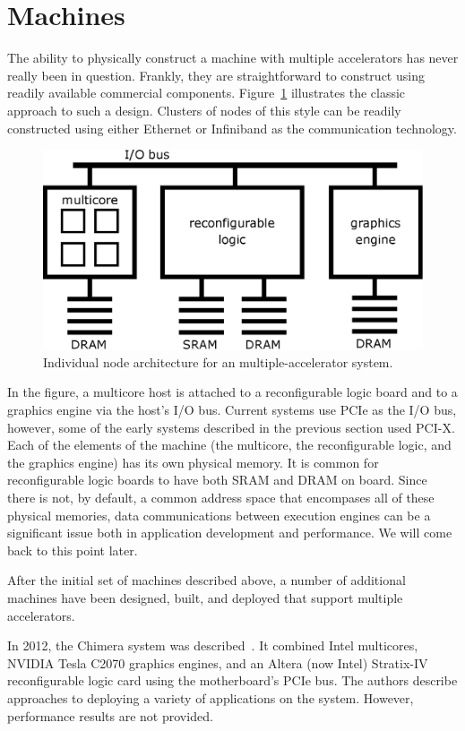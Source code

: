\section{Machines}
\label{sec:machines}

The ability to physically construct a machine with multiple accelerators
has never really been in question.  Frankly, they are straightforward to
construct using readily available commercial components.
Figure~\ref{fig:nodearch} illustrates the classic approach to such a design.
Clusters of nodes of this style can be readily constructed using either
Ethernet or Infiniband as the communication technology.

\begin{figure}[ht]
\centering
\includegraphics[width=0.75\linewidth]{nodearch}
\caption{Individual node architecture for an multiple-accelerator system.}
\label{fig:nodearch}
\end{figure}

In the figure, a multicore host is attached to a reconfigurable logic board
and to a graphics engine via the host's I/O bus.  Current systems use
PCIe as the I/O bus, however, some of the early systems described in
the previous section used PCI-X.
Each of the elements of the machine (the multicore, the reconfigurable
logic, and the graphics engine) has its own physical memory.  It is common
for reconfigurable logic boards to have both SRAM and DRAM on board.
Since there is not, by default, a common address space that encompases
all of these physical memories, data communications between execution
engines can be a significant issue both in application development and
performance.  We will come back to this point later.

After the initial set of machines described above,
a number of additional machines have been designed, built, and deployed
that support multiple accelerators.

In 2012, the Chimera system was described~\cite{ibs12}.
It combined Intel multicores, NVIDIA Tesla C2070 graphics engines,
and an Altera (now Intel) Stratix-IV reconfigurable logic card using
the motherboard's PCIe bus. The authors describe approaches to deploying
a variety of applications on the system. However, performance results
are not provided.

